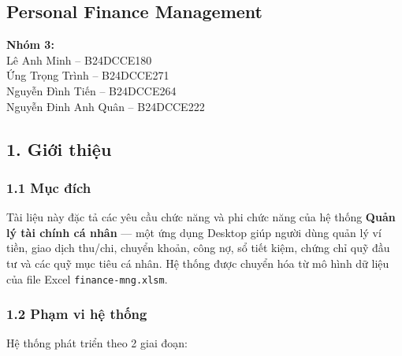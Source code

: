 \documentclass[11pt,a4paper]{article}
\author{}
\date{}
\begin{document}
\begin{center}

\section{\texorpdfstring{\huge \textbf{Personal Finance Management}}{Personal Finance Management}}\label{personal-finance-management}

    {\Large \textbf{Nhóm 3:}} \\[0.3cm]
    Lê Anh Minh -- B24DCCE180 \\
    Ứng Trọng Trình -- B24DCCE271 \\
    Nguyễn Đình Tiến -- B24DCCE264 \\
    Nguyễn Đinh Anh Quân -- B24DCCE222 
\end{center} 
\newpage

\renewcommand{\contentsname}{\huge\textbf{Mục lục}}
\tableofcontents
\newpage

\subsection{1. Giới thiệu}\label{giux1edbi-thiux1ec7u}

\subsubsection{1.1 Mục đích}\label{mux1ee5c-ux111uxedch}

Tài liệu này đặc tả các yêu cầu chức năng và phi chức năng của hệ thống
\textbf{Quản lý tài chính cá nhân} --- một ứng dụng Desktop giúp người
dùng quản lý ví tiền, giao dịch thu/chi, chuyển khoản, công nợ, sổ tiết
kiệm, chứng chỉ quỹ đầu tư và các quỹ mục tiêu cá nhân. Hệ thống được
chuyển hóa từ mô hình dữ liệu của file Excel \texttt{finance-mng.xlsm}.

\subsubsection{1.2 Phạm vi hệ thống}\label{phux1ea1m-vi-hux1ec7-thux1ed1ng}

Hệ thống phát triển theo 2 giai đoạn:
\end{document}
